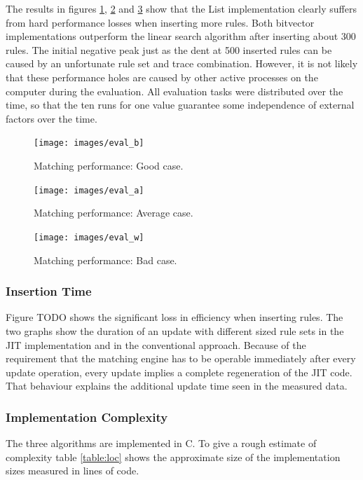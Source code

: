 \documentclass[a4paper,
		12pt,
		parskip=full,
		titlepage
		]{scrartcl}
\begin{document}
The results in figures \ref{fig:eval_good_case}, \ref{fig:eval_average_case} and \ref{fig:eval_bad_case} show that the List implementation
clearly suffers from hard performance losses when inserting more rules.
Both bitvector implementations outperform the linear search algorithm after inserting about 300 rules.
The initial negative peak just as the dent at 500 inserted rules can be caused by an unfortunate rule set and trace combination.
However, it is not likely that these performance holes are caused by other active processes on the computer during the evaluation.
All evaluation tasks were distributed over the time, so that the ten runs 
for one value guarantee some independence of external factors over the time.

\begin{figure}
\centering
\texttt{[image: images/eval\_b]}
\caption{Matching performance: Good case.}
\label{fig:eval_good_case}
\end{figure}

\begin{figure}
\centering
\texttt{[image: images/eval\_a]}
\caption{Matching performance: Average case.}
\label{fig:eval_average_case}
\end{figure}

\begin{figure}
\centering
\texttt{[image: images/eval\_w]}
\caption{Matching performance: Bad case.}
\label{fig:eval_bad_case}
\end{figure}

\subsubsection{Insertion Time}
Figure TODO shows the significant loss in efficiency when inserting rules. %
The two graphs show the duration of an update with different sized rule sets in the JIT implementation and in the conventional approach.
Because of the requirement that the matching engine has to be operable 
immediately after every update operation, every update implies a complete regeneration of the JIT code.
That behaviour explains the additional update time seen in the measured data. 

\subsubsection{Implementation Complexity}
The three algorithms are implemented in C.
To give a rough estimate of complexity table \ref{table:loc} shows the approximate size of the implementation sizes measured in lines of code.
\end{document}
